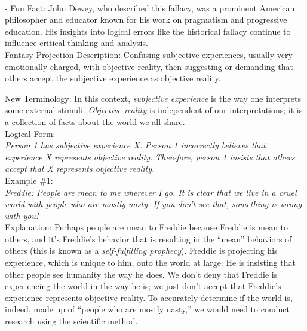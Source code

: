\documentclass[a4paper,12pt,single,pdftex]{scrartcl}
\begin{document}
    
      
    \\

    
      - Fun Fact: John Dewey, who described this fallacy, was a prominent American philosopher and educator known for his work on pragmatism and progressive education. His insights into logical errors like the historical fallacy continue to influence critical thinking and analysis.
    \\

  

Fantasy Projection
    Description: Confusing subjective experiences, usually very emotionally charged, with objective reality, then suggesting or demanding that others accept the subjective experience as objective reality.

    
      New Terminology: In this context, {\em subjective experience}  is the way one interprets some external stimuli. {\em Objective reality}  is independent of our interpretations; it is a collection of facts about the world we all share.
    \\

    
      Logical Form:
    \\

    
      {\em Person 1 has subjective experience X.} \newline
{\em Person 1 incorrectly believes that experience X represents objective reality.} \newline
{\em Therefore, person 1 insists that others accept that X represents objective reality.}
    \\

    
      Example \#1:
    \\

    
      {\em Freddie: People are mean to me wherever I go. It is clear that we live in a cruel world with people who are mostly nasty. If you don’t see that, something is wrong with you!}
    \\

    
      Explanation: Perhaps people are mean to Freddie because Freddie is mean to others, and it’s Freddie’s behavior that is resulting in the “mean” behaviors of others (this is known as a {\em self-fulfilling prophecy}). Freddie is projecting his experience, which is unique to him, onto the world at large. He is insisting that other people see humanity the way he does. We don’t deny that Freddie is experiencing the world in the way he is; we just don’t accept that Freddie’s experience represents objective reality. To accurately determine if the world is, indeed, made up of “people who are mostly nasty,” we would need to conduct research using the scientific method.
    \\
\end{document}
